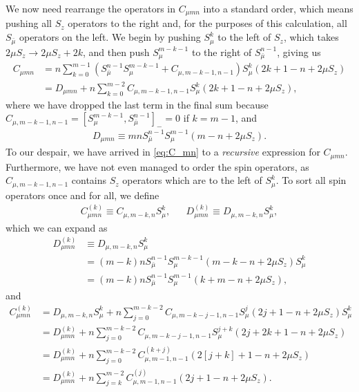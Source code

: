 \documentclass[aps,notitlepage,nofootinbib,11pt]{revtex4-1}
\newcommand{\p}[1]{\left(#1\right)} %
\renewcommand{\sp}[1]{\left[#1\right]} %
\newcommand{\bmu}{{\bar\mu}}
\newcommand{\1}{\mathds{1}}
\begin{document}
We now need rearrange the operators in $C_{\mu mn}$ into a standard
order, which means pushing all $S_z$ operators to the right and, for
the purposes of this calculation, all $S_\bmu$ operators on the left.
We begin by pushing $S_\mu^k$ to the left of $S_z$, which takes
$2\mu S_z\to 2\mu S_z+2k$, and then push $S_\mu^{m-k-1}$ to the right
of $S_\bmu^{n-1}$, giving us
\begin{align}
  C_{\mu mn}
  &= n \sum_{k=0}^{m-1}
  \p{S_\bmu^{n-1} S_\mu^{m-k-1} + C_{\mu,m-k-1,n-1}} S_\mu^k
  \p{2k + 1 - n + 2\mu S_z} \\
  &= D_{\mu mn}
  + n \sum_{k=0}^{m-2} C_{\mu,m-k-1,n-1}
  S_\mu^k \p{2k + 1 - n + 2\mu S_z},
  \label{eq:C_mn}
\end{align}
where we have dropped the last term in the final sum because
$C_{\mu,m-k-1,n-1}=\sp{S_\mu^{m-k-1},S_\bmu^{n-1}}_-=0$ if $k=m-1$,
and
\begin{align}
  D_{\mu mn}
  \equiv mn S_\bmu^{n-1} S_\mu^{m-1} \p{m - n + 2\mu S_z}.
  \label{eq:D_mn}
\end{align}
To our despair, we have arrived in \eqref{eq:C_mn} to a {\it
  recursive} expression for $C_{\mu mn}$.  Furthermore, we have not
even managed to order the spin operators, as $C_{\mu,m-k-1,n-1}$
contains $S_z$ operators which are to the left of $S_\mu^k$.  To sort
all spin operators once and for all, we define
\begin{align}
  C_{\mu mn}^{(k)} \equiv C_{\mu,m-k,n} S_\mu^k,
  &&
  D_{\mu mn}^{(k)} \equiv D_{\mu,m-k,n} S_\mu^k,
\end{align}
which we can expand as
\begin{align}
  D_{\mu mn}^{(k)}
  &\equiv D_{\mu,m-k,n}S_\mu^k \\
  &= \p{m-k}n S_\bmu^{n-1} S_\mu^{m-k-1}
  \p{m-k-n+2\mu S_z} S_\mu^k \\
  &= \p{m-k}n S_\bmu^{n-1} S_\mu^{m-1} \p{k+m-n+2\mu S_z},
  \label{eq:D_mn_k}
\end{align}
and
\begin{align}
  C_{\mu mn}^{(k)}
  &= D_{\mu,m-k,n} S_\mu^k + n \sum_{j=0}^{m-k-2}
  C_{\mu,m-k-j-1,n-1} S_\mu^j \p{2j+1-n+2\mu S_z} S_\mu^k \\
  &= D_{\mu mn}^{(k)} + n \sum_{j=0}^{m-k-2}
  C_{\mu,m-k-j-1,n-1} S_\mu^{j+k} \p{2j+2k+1-n+2\mu S_z} \\
  &= D_{\mu mn}^{(k)} + n \sum_{j=0}^{m-k-2}
  C_{\mu,m-1,n-1}^{(k+j)} \p{2\sp{j+k}+1-n+2\mu S_z} \\
  &= D_{\mu mn}^{(k)} + n \sum_{j=k}^{m-2}
  C_{\mu,m-1,n-1}^{(j)} \p{2j+1-n+2\mu S_z}.
  \label{eq:C_mn_k}
\end{align}
\end{document}
